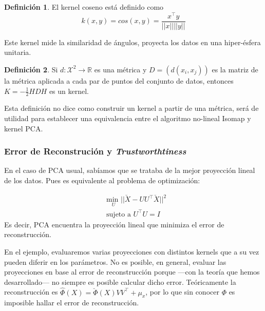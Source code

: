 \documentclass{article}
\numberwithin{equation}{section}
\theoremstyle{remark}
\theoremstyle{definition}
\newtheorem{definition}{Definición}
\theoremstyle{remark}
\theoremstyle{remark}
\begin{document}
\begin{definition}
    El kernel coseno está definido como
    $$k(x,y) = cos(x,y) = \frac{x^\intercal y}{||x|| ||y||}$$
\end{definition}

Este kernel mide la similaridad de ángulos, proyecta los datos en una hiper-ésfera unitaria.

\begin{definition}
    Si $d: \mathcal{X}^2 \to \mathbb{R}$ es una métrica y 
    $D = (d(x_i, x_j))$ es la matriz de la métrica aplicada a cada par de puntos del conjunto de datos, entonces
    $K = - \frac{1}{2} H D H$ es un kernel.
\end{definition}

Esta definición no dice como construir un kernel a partir de una métrica, será de utilidad para establecer una equivalencia entre
el algoritmo no-lineal Isomap y kernel PCA.

\subsubsection{Error de Reconstrución y \textit{Trustworthtiness}}

En el caso de PCA usual, sabíamos que se trataba de la mejor proyección lineal de los datos. Pues es equivalente al problema de optimización:

\begin{equation*}
    \begin{aligned}
    & \underset{U}{\text{min }} ||\breve{X} - U U^\intercal \breve{X}||^2\\
    & \text{sujeto a } U^\intercal U = I
    \end{aligned}
\end{equation*}
Es decir, PCA encuentra la proyección lineal que minimiza el error de reconstrucción.

En el ejemplo, evaluaremos varias proyecciones con distintos kernels que a su vez pueden diferir en los parámetros.
No es posible, en general, evaluar las proyecciones en base al error de reconstrucción porque ---con la teoría que hemos desarrollado---
no siempre es posible calcular dicho error.
Teóricamente la reconstrucción es $\hat{\Phi}(X) = \breve{\Phi}(X) V V^\intercal + \mu_x$, por lo que sin conocer $\Phi$ es imposible hallar el error de reconstrucción.
\end{document}

